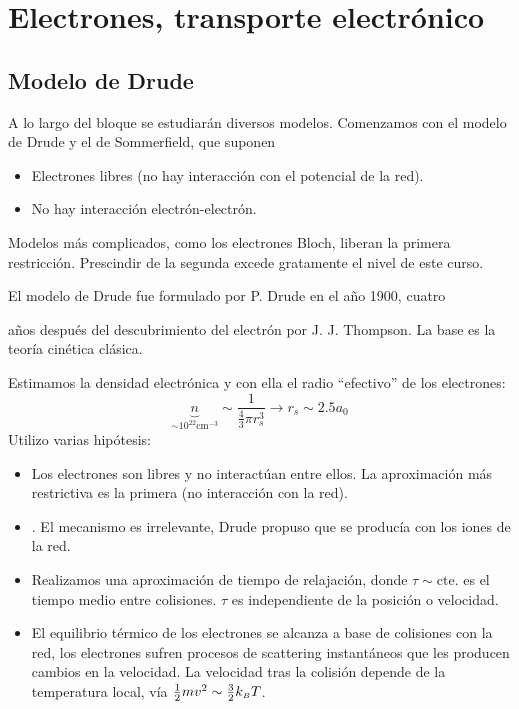 \part{Electrones, transporte electrónico}

\chapter{Modelo de Drude}

A lo largo del bloque se estudiarán diversos modelos. Comenzamos con
el modelo de Drude y el de Sommerfield, que suponen
\begin{itemize}
\item Electrones libres (no hay interacción con el potencial de la red).
\item No hay interacción electrón-electrón.
\end{itemize}
Modelos más complicados, como los electrones Bloch, liberan la primera
restricción. Prescindir de la segunda excede gratamente el nivel de este curso.

El modelo de Drude fue formulado por P. Drude en el año 1900, cuatro


años después del descubrimiento del electrón por J. J. Thompson. La
base es la teoría cinética clásica.

Estimamos la densidad electrónica y con ella el radio ``efectivo'' de
los electrones:
\begin{equation}
  \underbrace{n}_{\sim 10^{22} \text{cm}^{-3}} \sim
  \frac{1}{\frac{4}{3}\pi r_s^3} \rightarrow r_s \sim 2.5 a_0
\end{equation}
Utilizo varias hipótesis:
\begin{itemize}
\item Los electrones son libres y no interactúan entre ellos. La
  aproximación más restrictiva es la primera (no interacción con la red).
\item . El mecanismo es irrelevante,
  Drude propuso que se producía con los iones de la red.
\item Realizamos una aproximación de tiempo de relajación, donde
  $\tau \sim \text{cte.}$ es el tiempo medio entre colisiones. $\tau$
  es independiente de la posición o velocidad.
\item El equilibrio térmico de los electrones se alcanza a base de
  colisiones con la red, los electrones sufren procesos de scattering
  instantáneos que les producen cambios en la velocidad. La velocidad tras la colisión depende de la temperatura local,
  vía $\frac{1}{2}mv^2 \sim \frac{3}{2}k_{\scriptscriptstyle{B}}  T$.
\end{itemize}

